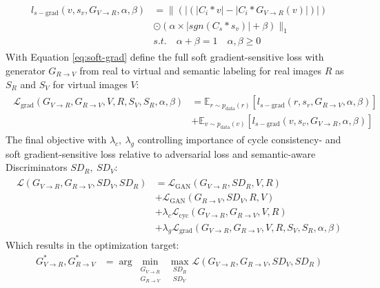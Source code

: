 \begin{align}
	\begin{split}
		l_{s-\text{grad}}(v, s_v, G_{V\rightarrow R}, \alpha, \beta) &= \lVert(|(|C_i*v|-|C_i*G_{V\rightarrow R}(v)|)|)\\
		&\odot (\alpha \times |sgn(C_s*s_v)|+\beta)\rVert_1\\
		&s.t. \quad \alpha + \beta = 1 \quad \alpha, \beta \geq 0
	\end{split} \label{eq:soft-grad}
\end{align}
With Equation \ref{eq:soft-grad} define the full soft gradient-sensitive loss with generator $G_{R\rightarrow V}$ from real to virtual and semantic labeling for real images $R$ as $S_R$ and $S_V$ for virtual images $V$:
\begin{align}
	\begin{split}
		\mathcal{L}_{\text{grad}}(G_{V\rightarrow R}, G_{R\rightarrow V}, V, R, S_V, S_R, \alpha, \beta) &= \mathbb{E}_{r\sim p_{\text{data}}(r)}[l_{s-\text{grad}}(r,s_r, G_{R\rightarrow V}, \alpha, \beta)]\\
		&+ \mathbb{E}_{v\sim p_{\text{data}}(v)}[l_{s-\text{grad}}(v,s_v, G_{V\rightarrow R}, \alpha, \beta)]
	\end{split}
\end{align}
The final objective with $\lambda_c, ~ \lambda_g$ controlling importance of cycle consistency- and soft gradient-sensitive loss relative to adversarial loss and semantic-aware Discriminators $SD_R,~SD_V$:
\begin{align}
	\begin{split}
		\mathcal{L}(G_{V\rightarrow R}, G_{R\rightarrow V}, SD_V, SD_R) &= \mathcal{L}_{\text{GAN}}(G_{V\rightarrow R}, SD_R, V, R)\\
		&+ \mathcal{L}_{\text{GAN}}(G_{R\rightarrow V}, SD_V, R, V)\\
		&+ \lambda_c \mathcal{L}_{\text{cyc}}(G_{V\rightarrow R}, G_{R\rightarrow V}, V, R)\\
		&+ \lambda_g \mathcal{L}_{\text{grad}}(G_{V\rightarrow R}, G_{R\rightarrow V}, V, R, S_V, S_R, \alpha, \beta)
	\end{split}
\end{align}
Which results in the optimization target:
\begin{align}
	G^*_{V\rightarrow R}, G^*_{R\rightarrow V} &= \arg \underset{\substack{G_{V\rightarrow R}\\ G_{R\rightarrow V}}}{\min}~ \underset{\substack{SD_R\\SD_V}}{\max}\mathcal{L}(G_{V\rightarrow R}, G_{R\rightarrow V}, SD_V, SD_R)
\end{align}
